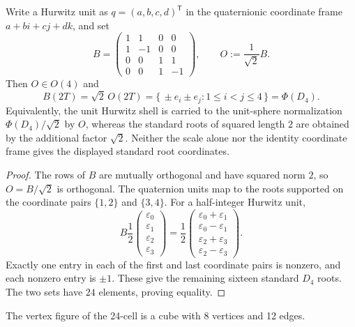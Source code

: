 \documentclass[11pt]{article}
\begin{document}
\begin{proposition}
\label{p1:prop:hurwitz-d4-coordinate-map}
\leavevmode\par
Write a Hurwitz unit as \(q=(a,b,c,d)^{\mathsf T}\) in the quaternionic
coordinate frame \(a+bi+cj+dk\), and set
\[
 B=
 \begin{pmatrix}
 1&1&0&0\\
 1&-1&0&0\\
 0&0&1&1\\
 0&0&1&-1
 \end{pmatrix},
 \qquad
 O:=\frac1{\sqrt2}B.
\]
Then \(O\in O(4)\) and
\[
 B(2T)=\sqrt2\,O(2T)
 =\{\,\pm e_i\pm e_j:1\le i<j\le4\,\}
 =\Phi(D_4).
\]
Equivalently, the unit Hurwitz shell is carried to the unit-sphere
normalization \(\Phi(D_4)/\sqrt2\) by \(O\), whereas the standard roots of
squared length \(2\) are obtained by the additional factor \(\sqrt2\).
Neither the scale alone nor the identity coordinate frame gives the displayed
standard root coordinates.
\end{proposition}

\begin{proof}
The rows of \(B\) are mutually orthogonal and have squared norm \(2\), so
\(O=B/\sqrt2\) is orthogonal.  The quaternion units map to the roots supported
on the coordinate pairs \(\{1,2\}\) and \(\{3,4\}\).  For a half-integer
Hurwitz unit,
\[
 B\frac12
 \begin{pmatrix}\varepsilon_0\\\varepsilon_1\\\varepsilon_2\\\varepsilon_3\end{pmatrix}
 =\frac12
 \begin{pmatrix}
 \varepsilon_0+\varepsilon_1\\
 \varepsilon_0-\varepsilon_1\\
 \varepsilon_2+\varepsilon_3\\
 \varepsilon_2-\varepsilon_3
 \end{pmatrix}.
\]
Exactly one entry in each of the first and last coordinate pairs is nonzero,
and each nonzero entry is \(\pm1\).  These give the remaining sixteen
standard \(D_4\) roots.  The two sets have \(24\) elements, proving equality.
\end{proof}

\begin{proposition}
\label{p1:prop:24cell-vertex-figure}
The vertex figure of the 24-cell is a cube with 8 vertices and 12 edges.
\cite{coxeter1973regular}
\end{proposition}
\end{document}
